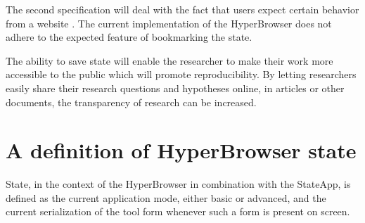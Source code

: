 \documentclass[english]{ifimaster}
\begin{document}
The second specification will deal with the fact that users expect certain behavior from a website  \parencite{mikowski}  \parencite{nielsen1997user}. The current implementation of the HyperBrowser does not adhere to the expected feature of bookmarking the state. 

The ability to save state will enable the researcher to make their work more accessible to the public which will promote reproducibility. By letting researchers easily share their research questions and hypotheses online, in articles or other documents, the transparency of research can be increased. 


\section{A definition of HyperBrowser state}
State, in the context of the HyperBrowser in combination with the StateApp, is defined as the current application mode, either basic or advanced, and the current serialization of the tool form whenever such a form is present on screen. 














\end{document}
